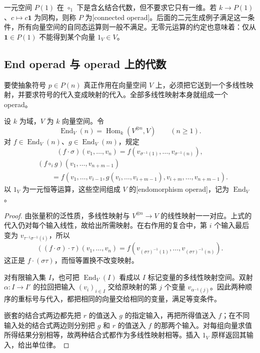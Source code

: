 \ProseParagraphBreak
一元空间 \(P(1)\) 在 \(\circ_1\) 下是含幺结合代数，但不要求它只有一维。若 \(k\rightarrow P(1)\)、\(c\mapsto c\mathbf1\) 为同构，则称 \(P\) 为[connected operad]。后面的二元生成例子满足这一条件，所有向量空间的自同态运算则一般不满足。无零元运算的约定也意味着：仅从 \(\mathbf1\in P(1)\) 不能得到某个向量 \(1_V\in V\)。

\subsection{End operad 与 operad 上的代数}
\label{b4:subsec:G01:02}

要使抽象符号 \(p\in P(n)\) 真正作用在向量空间 \(V\) 上，必须把它送到一个多线性映射，并要求符号的代入变成映射的代入。全部多线性映射本身就组成一个 operad。

\begin{proposition}\label{b4:prop:endomorphism-operad}
	设 \(k\) 为域，\(V\) 为 \(k\) 向量空间。令
	\[
		\operatorname{End}_V(n)=\operatorname{Hom}_k(V^{\otimes n},V)\qquad(n\geq1).
	\]
	对 \(f\in\operatorname{End}_V(n)\)、\(g\in\operatorname{End}_V(m)\)，规定
	\[
		(f\cdot\sigma)(v_1,\ldots,v_n)=f(v_{\sigma^{-1}(1)},\ldots,v_{\sigma^{-1}(n)}),
	\]
	\[
		\begin{aligned}
			&(f\circ_i g)(v_1,\ldots,v_{n+m-1})\\
			&\qquad=f(v_1,\ldots,v_{i-1},g(v_i,\ldots,v_{i+m-1}),v_{i+m},\ldots,v_{n+m-1}).
		\end{aligned}
	\]
	以 \(1_V\) 为一元恒等运算，这些空间组成 \(V\) 的[endomorphism operad]，记为 \(\operatorname{End}_V\)。
\end{proposition}
\begin{proof}
	由张量积的泛性质，多线性映射与 \(V^{\otimes n}\rightarrow V\) 的线性映射一一对应。上式的代入仍对每个输入线性，故给出所需映射。在右作用的复合中，第 \(i\) 个输入最后变为 \(v_{\tau^{-1}\sigma^{-1}(i)}\)，所以
	\[
		((f\cdot\sigma)\cdot\tau)(v_1,\ldots,v_n)
		=f(v_{(\sigma\tau)^{-1}(1)},\ldots,v_{(\sigma\tau)^{-1}(n)}).
	\]
	这正是 \(f\cdot(\sigma\tau)\)，而恒等置换不改变映射。

	对有限输入集 \(I\)，也可把 \(\operatorname{End}_V(I)\) 看成以 \(I\) 标记变量的多线性映射空间。双射 \(\alpha:I\rightarrow I'\) 的拉回把输入 \((v_i)_{i\in I}\) 交给原映射的第 \(j\) 个变量 \(v_{\alpha^{-1}(j)}\)。因此两种顺序的重标号与代入，都把相同的向量交给相同的变量，满足等变条件。

	嵌套的结合式两边都先把 \(r\) 的值送入 \(g\) 的指定输入，再把所得值送入 \(f\)；在不同输入处的结合式两边则分别把 \(g\) 和 \(r\) 的值送入 \(f\) 的那两个输入。对每组向量求值所得结果分别相等，故两种结合式都作为多线性映射相等。插入 \(1_V\) 原样返回其输入，给出单位律。
\end{proof}

